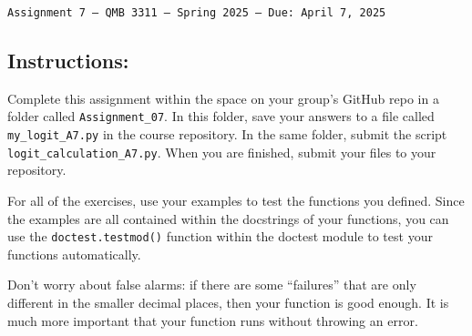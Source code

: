 \documentclass[11pt]{exam}
\begin{document}
\texttt{Assignment 7 --- QMB 3311 ---  Spring 2025  --- Due: April 7, 2025}

\subsection*{Instructions:}

Complete this assignment within the space on your group's GitHub repo in a folder called \texttt{Assignment\_07}. In this folder, save your answers to a file called \texttt{my\_logit\_A7.py} in the course repository. In the same folder, submit the script \texttt{logit\_calculation\_A7.py}. When you are finished, submit your files to your repository.

For all of the exercises, use your examples to test the functions you defined. Since the examples are all contained within the docstrings of your functions, you can use the
\texttt{doctest.testmod()} function within the doctest module to test your functions automatically.

Don't worry about false alarms: if there are some ``failures'' that are only different in the smaller decimal places, then your function is good enough. It is much more important that your function runs without throwing an error.
\end{document}
